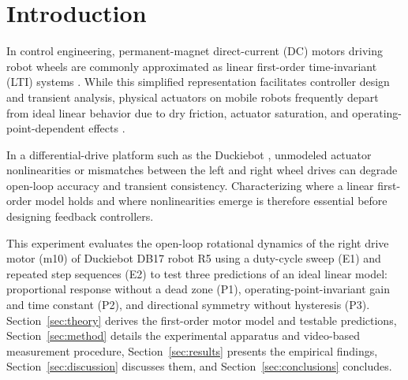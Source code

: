 \section{Introduction}
\label{sec:introduction}

In control engineering, permanent-magnet direct-current (DC) motors driving robot wheels are commonly approximated as linear first-order time-invariant (LTI) systems \parencite{franklin2019FeedbackControlDynamic}. While this simplified representation facilitates controller design and transient analysis, physical actuators on mobile robots frequently depart from ideal linear behavior due to dry friction, actuator saturation, and operating-point-dependent effects \parencite{armstronghelouvry1994SurveyModelsAnalysis}.

In a differential-drive platform such as the Duckiebot \parencite{paull2017DuckietownOpenInexpensive}, unmodeled actuator nonlinearities or mismatches between the left and right wheel drives can degrade open-loop accuracy and transient consistency. Characterizing where a linear first-order model holds and where nonlinearities emerge is therefore essential before designing feedback controllers.

This experiment evaluates the open-loop rotational dynamics of the right drive motor (m10) of Duckiebot DB17 robot R5 using a duty-cycle sweep (E1) and repeated step sequences (E2) to test three predictions of an ideal linear model: proportional response without a dead zone (P1), operating-point-invariant gain and time constant (P2), and directional symmetry without hysteresis (P3). Section~\ref{sec:theory} derives the first-order motor model and testable predictions, Section~\ref{sec:method} details the experimental apparatus and video-based measurement procedure, Section~\ref{sec:results} presents the empirical findings, Section~\ref{sec:discussion} discusses them, and Section~\ref{sec:conclusions} concludes.

